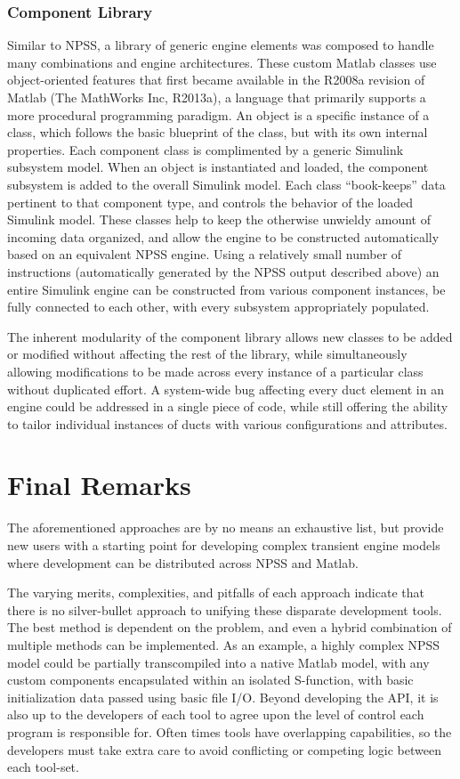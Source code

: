 \documentclass[heading.tex]{subfiles}
\begin{document}
\subsubsection{Component Library}

Similar to NPSS, a library of generic engine elements was composed to handle many combinations and
engine architectures. These custom Matlab classes use object-oriented features that first became
available in the R2008a revision of Matlab (The MathWorks Inc, R2013a), a language that primarily
supports a more procedural programming paradigm. An object is a specific instance of a class,
which follows the basic blueprint of the class, but with its own internal properties. Each
component class is complimented by a generic Simulink subsystem model. When an object is
instantiated and loaded, the component subsystem is added to the overall Simulink model. Each
class “book-keeps” data pertinent to that component type, and controls the behavior of the loaded
Simulink model. These classes help to keep the otherwise unwieldy amount of incoming data
organized, and allow the engine to be constructed automatically based on an equivalent NPSS
engine. Using a relatively small number of instructions (automatically generated by the NPSS
output described above) an entire Simulink engine can be constructed from various component
instances, be fully connected to each other, with every subsystem appropriately populated.

	The inherent modularity of the component library allows new classes to be added or modified
without affecting the rest of the library, while simultaneously allowing modifications to be made
across every instance of a particular class without duplicated effort. A system-wide bug affecting
every duct element in an engine could be addressed in a single piece of code, while still offering
the ability to tailor individual instances of ducts with various configurations and attributes.

\section{Final Remarks}

The aforementioned approaches are by no means an exhaustive list,
but provide new users with a starting point for developing complex transient engine models
where development can be distributed across NPSS and Matlab.

The varying merits, complexities, and pitfalls of each approach indicate that there is
no silver-bullet approach to unifying these disparate development tools.
The best method is dependent on the problem,
and even a hybrid combination of multiple methods can be implemented.
As an example, a highly complex NPSS model could be partially transcompiled into a native Matlab model,
with any custom components encapsulated within an isolated S-function,
with basic initialization data passed using basic file I/O.
Beyond developing the API, it is also up to the developers of each tool to
agree upon the level of control each program is responsible for.
Often times tools have overlapping capabilities, so the developers must take extra care to
avoid conflicting or competing logic between each tool-set.
\end{document}
